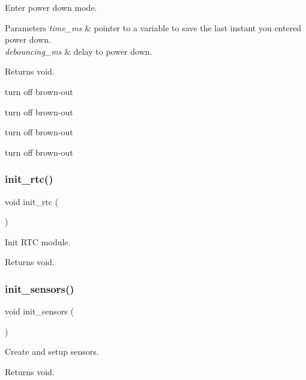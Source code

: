 Enter power down mode. 


\begin{DoxyParams}{Parameters}
{\em time\+\_\+ms} & pointer to a variable to save the last instant you entered power down. \\
\hline
{\em debouncing\+\_\+ms} & delay to power down. \\
\hline
\end{DoxyParams}
\begin{DoxyReturn}{Returns}
void. 
\end{DoxyReturn}
turn off brown-\/out

turn off brown-\/out

turn off brown-\/out

turn off brown-\/out \mbox{\label{i2c-th_8h_a88533ad02465ce52d4e6de7b2095ec32}} 
\subsubsection{\texorpdfstring{init\+\_\+rtc()}{init\_rtc()}}
{\footnotesize\ttfamily void init\+\_\+rtc (\begin{DoxyParamCaption}{ }\end{DoxyParamCaption})}



Init R\+TC module. 

\begin{DoxyReturn}{Returns}
void. 
\end{DoxyReturn}
\mbox{\label{i2c-th_8h_ad7577ba7f06f417a019b69da8682ede5}} 
\subsubsection{\texorpdfstring{init\+\_\+sensors()}{init\_sensors()}}
{\footnotesize\ttfamily void init\+\_\+sensors (\begin{DoxyParamCaption}{ }\end{DoxyParamCaption})}



Create and setup sensors. 

\begin{DoxyReturn}{Returns}
void. 
\end{DoxyReturn}
\mbox{\label{i2c-th_8h_a4454f968b2402a0e61deb15ab2571dab}} 
